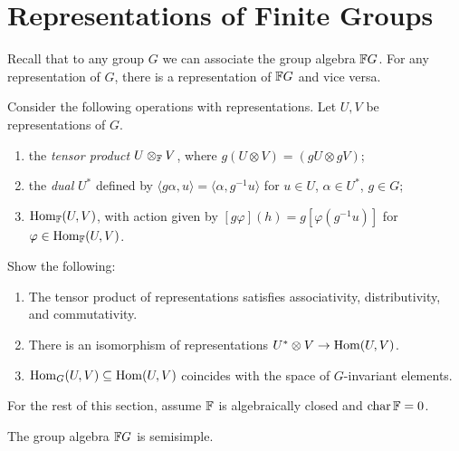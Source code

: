 \section{Representations of Finite Groups}

\begin{remark}
  Recall that to any group $G$ we can
  associate the group algebra
  $\mathbb{F} G$. For any representation of
  $G$, there is a representation
  of $\mathbb{F} G$ and vice versa.
\end{remark}

\begin{remark}
  Consider the following operations
  with representations. Let $U, V$
  be representations of $G$.
  \begin{enumerate}
    \item the \emph{tensor product} $U \otimes_{\mathbb{F}} V$, where
      $g(U \otimes V) = (g U \otimes gV)$;
    \item the \emph{dual} $U^*$
      defined by
      $\langle g \alpha, u \rangle = \langle \alpha, g^{-1} u \rangle$
      for $u \in U$, $\alpha \in U^*$,
      $g \in G$;
    \item $\operatorname{Hom}_{\mathbb{F}}(U, V)$, with
      action given by
      $[g \varphi](h) = g[\varphi(g^{-1} u)]$
      for $\varphi \in \operatorname{Hom}_{\mathbb{F}}(U, V)$.
  \end{enumerate}
\end{remark}

\begin{exercise}
  Show the following:
  \begin{enumerate}
    \item The tensor product of
      representations satisfies
      associativity, distributivity, and
      commutativity.
    \item There is an isomorphism
      of representations
      $U^* \otimes V \to \operatorname{Hom}(U, V)$.
    \item $\operatorname{Hom}_G(U, V) \subseteq \operatorname{Hom}(U, V)$
      coincides with the space
      of $G$-invariant elements.
  \end{enumerate}
\end{exercise}

\begin{remark}
  For the rest of this section,
  assume $\mathbb{F}$ is algebraically closed
  and $\operatorname{char} \mathbb{F} = 0$.
\end{remark}

\begin{theorem}
  The group algebra $\mathbb{F} G$ is semisimple.
\end{theorem}

